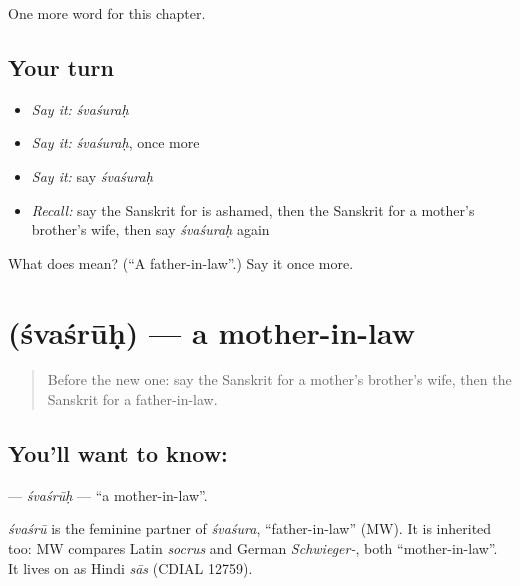 \begin{grammarlens}[title={What you've built}]
One more word for this chapter.
\end{grammarlens}

\subsection*{Your turn}
\begin{itemize}
\raggedright
  \item \emph{Say it:} \emph{śvaśuraḥ}
  \item \emph{Say it:} \emph{śvaśuraḥ}, once more
  \item \emph{Say it:} say \emph{śvaśuraḥ}
  \item \emph{Recall:} say the Sanskrit for is ashamed, then the Sanskrit for a mother's brother's wife, then say \emph{śvaśuraḥ} again
\end{itemize}

\begin{tcolorbox}[breakable,colback=teal!4,colframe=teal!35!black,title={Before you move on}]
What does  mean? (\textquotedblleft{}A father-in-law\textquotedblright{}.) Say it once more.
\end{tcolorbox}
\section[\texorpdfstring{\sk{श्वश्रूः} (śvaśrūḥ)}{श्वश्रूः (śvaśrūḥ)}]{ (śvaśrūḥ) — a mother-in-law}

\label{lesson:SA-C178-svasruh}



\begin{quote}
Before the new one: say the Sanskrit for a mother's brother's wife, then the Sanskrit for a father-in-law.
\end{quote}

\subsection*{You'll want to know: }
\textbf{} — \emph{śvaśrūḥ} — \textquotedblleft{}a mother-in-law\textquotedblright{}.

\begin{cousinweb}
\emph{śvaśrū} is the feminine partner of \emph{śvaśura}, \textquotedblleft{}father-in-law\textquotedblright{} (MW). It is inherited too: MW compares Latin \emph{socrus} and German \emph{Schwieger-}, both \textquotedblleft{}mother-in-law\textquotedblright{}. It lives on as Hindi \emph{sās} (CDIAL 12759).
\end{cousinweb}

